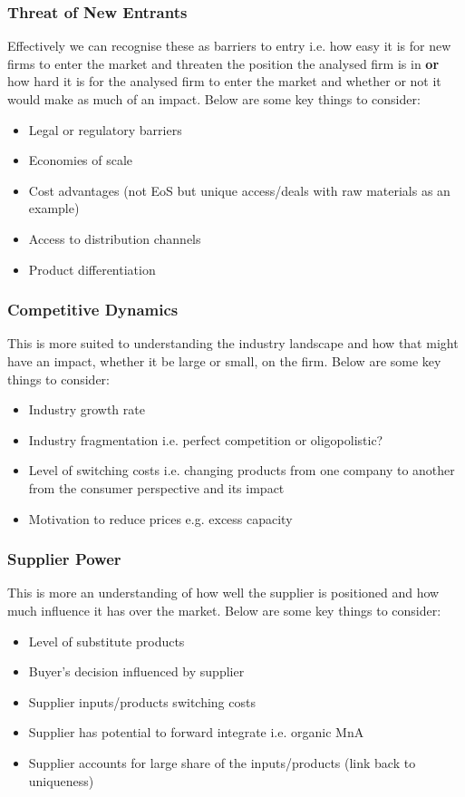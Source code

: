 \documentclass[a4paper]{article}
\begin{document}
{\subsubsection{Threat of New Entrants}
Effectively we can recognise these as barriers to entry i.e. how easy it is for new firms to enter the market and threaten the position the analysed firm is in \textbf{or} how hard it is for the analysed firm to enter the market and whether or not it would make as much of an impact. Below are some key things to consider:

\begin{itemize}
	\item Legal or regulatory barriers
	\item Economies of scale
	\item Cost advantages (not EoS but unique access/deals with raw materials as an example)
	\item Access to distribution channels
	\item Product differentiation
\end{itemize}

\subsubsection{Competitive Dynamics}
This is more suited to understanding the industry landscape and how that might have an impact, whether it be large or small, on the firm. Below are some key things to consider:

\begin{itemize}
	\item Industry growth rate
	\item Industry fragmentation i.e. perfect competition or oligopolistic?
	\item Level of switching costs i.e. changing products from one company to another from the consumer perspective and its impact
	\item Motivation to reduce prices e.g. excess capacity
\end{itemize}

\subsubsection{Supplier Power}
This is more an understanding of how well the supplier is positioned and how much influence it has over the market. Below are some key things to consider:

\begin{itemize}
	\item Level of substitute products
	\item Buyer's decision influenced by supplier
	\item Supplier inputs/products switching costs
	\item Supplier has potential to forward integrate i.e. organic MnA
	\item Supplier accounts for large share of the inputs/products (link back to uniqueness)
\end{itemize}

}
\end{document}
